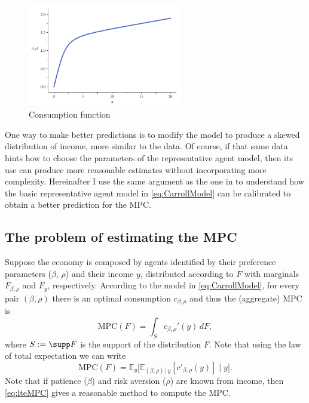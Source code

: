 \documentclass[english, a4paper, 12pt]{article}
\begin{document}
	\begin{figure}[H]
		\caption{Consumption function}
		\label{fig:concaveC}
		\includegraphics[width=0.6\textwidth]{CarrollCons}
		\vspace{-1ex}
	\end{figure}
	
One way to make better predictions is to modify the model to produce a skewed distribution of income, more similar to the data. Of course, if that same data hints how to choose the parameters of the representative agent model, then its use can produce more reasonable estimates without incorporating more complexity. Hereinafter I use the same argument as the one in  to understand how the basic representative agent model in \eqref{eq:CarrollModel} can be calibrated to obtain a better prediction for the MPC.

\subsection{The problem of estimating the MPC}
Suppose the economy is composed by agents identified by their preference parameters ($\beta$, $\rho$) and their income $y$, distributed according to $F$ with marginals $F_{\beta, \rho}$ and $F_{y}$, respectively. According to the model in \eqref{eq:CarrollModel}, for every pair $(\beta,\rho)$ there is an optimal consumption $c_{\beta,\rho}$ and thus the (aggregate) MPC is 
	$$ \mathrm{MPC}(F) = \int_{S} c_{\beta,\rho}'(y) \, dF, $$
where $S := \supp F$ is the support of the distribution $F$. Note that using the law of total expectation we can write
	\begin{equation} \label{eq:lteMPC}
		\mathrm{MPC}(F) = \mathbb{E}_{y}\Big[ \mathbb{E}_{(\beta,\rho) \, | \, y}[c'_{\beta,\rho}(y)] \; \Big| \; y \Big].
	\end{equation}
Note that if patience ($\beta$) and risk aversion ($\rho$) are known from income, then \eqref{eq:lteMPC} gives a reasonable method to compute the MPC.
\end{document}

